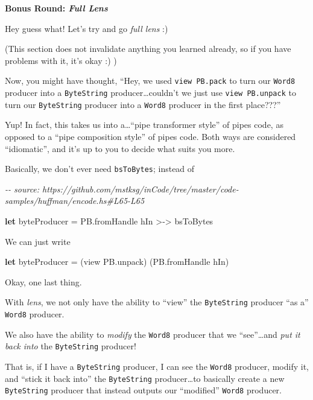 \documentclass[]{article}
\newenvironment{Shaded}{}{}
\newcommand{\CommentTok}[1]{\textcolor[rgb]{0.38,0.63,0.69}{\textit{#1}}}
\newcommand{\KeywordTok}[1]{\textcolor[rgb]{0.00,0.44,0.13}{\textbf{#1}}}
\newcommand{\NormalTok}[1]{#1}
\newcommand{\OperatorTok}[1]{\textcolor[rgb]{0.40,0.40,0.40}{#1}}
\newcommand{\OtherTok}[1]{\textcolor[rgb]{0.00,0.44,0.13}{#1}}
\begin{document}
\textbf{Bonus Round: \emph{Full Lens}}

Hey guess what! Let's try and go \emph{full lens} :)

(This section does not invalidate anything you learned already, so if you have
problems with it, it's okay :) )

Now, you might have thought, ``Hey, we used \texttt{view\ PB.pack} to turn our
\texttt{Word8} producer into a \texttt{ByteString} producer\ldots couldn't we
just use \texttt{view\ PB.unpack} to turn our \texttt{ByteString} producer into
a \texttt{Word8} producer in the first place???''

Yup! In fact, this takes us into a\ldots{}``pipe transformer style'' of pipes
code, as opposed to a ``pipe composition style'' of pipes code. Both ways are
considered ``idiomatic'', and it's up to you to decide what suits you more.

Basically, we don't ever need \texttt{bsToBytes}; instead of

\begin{Shaded}
\begin{Highlighting}[]
\CommentTok{{-}{-} source: https://github.com/mstksg/inCode/tree/master/code{-}samples/huffman/encode.hs\#L65{-}L65}

    \KeywordTok{let}\NormalTok{ byteProducer }\OtherTok{=}\NormalTok{ PB.fromHandle hIn }\OperatorTok{>{-}>}\NormalTok{ bsToBytes}
\end{Highlighting}
\end{Shaded}

We can just write

\begin{Shaded}
\begin{Highlighting}[]
\KeywordTok{let}\NormalTok{ byteProducer }\OtherTok{=}\NormalTok{ (view PB.unpack) (PB.fromHandle hIn)}
\end{Highlighting}
\end{Shaded}

Okay, one last thing.

With \emph{lens}, we not only have the ability to ``view'' the
\texttt{ByteString} producer ``as a'' \texttt{Word8} producer.

We also have the ability to \emph{modify} the \texttt{Word8} producer that we
``see''\ldots and \emph{put it back into} the \texttt{ByteString} producer!

That is, if I have a \texttt{ByteString} producer, I can see the \texttt{Word8}
producer, modify it, and ``stick it back into'' the \texttt{ByteString}
producer\ldots to basically create a new \texttt{ByteString} producer that
instead outputs our ``modified'' \texttt{Word8} producer.
\end{document}
